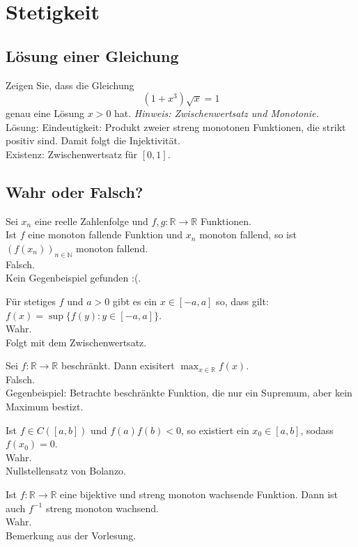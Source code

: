 \section{Stetigkeit}
\subsection{Lösung einer Gleichung}
Zeigen Sie, dass die Gleichung
\begin{displaymath}
  (1+x^3)\sqrt{x} = 1
\end{displaymath}
genau eine Lösung $x > 0$ hat. \textit{Hinweis: Zwischenwertsatz und Monotonie.}\\
Lösung: Eindeutigkeit: Produkt zweier streng monotonen Funktionen, die strikt positiv sind.
Damit folgt die Injektivität.\\
Existenz: Zwischenwertsatz für $[0,1]$.

\subsection{Wahr oder Falsch?}
Sei $x_n$ eine reelle Zahlenfolge und $f,g : \mathbb{R} \to \mathbb{R}$ Funktionen.\\
Ist $f$ eine monoton fallende Funktion und $x_n$ monoton fallend, so ist $(f(x_n))_{n \in \mathbb{N}}$ monoton fallend.\\
Falsch.\\
Kein Gegenbeispiel gefunden :(.

Für stetiges $f$ und $a > 0$ gibt es ein $x \in [-a,a]$ so, dass gilt: $f(x) = \sup\{f(y) : y \in [-a,a]\}$.\\
Wahr.\\
Folgt mit dem Zwischenwertsatz.

Sei $f : \mathbb{R} \to \mathbb{R}$ beschränkt.
Dann exisitert $\max_{x \in \mathbb{R}} f(x)$.\\
Falsch.\\
Gegenbeispiel: Betrachte beschränkte Funktion, die nur ein Supremum, aber kein Maximum bestizt.

Ist $f \in C([a,b])$ und $f(a)f(b) < 0$, so existiert ein $x_0 \in [a,b]$, sodass $f(x_0) = 0$.\\
Wahr.\\
Nullstellensatz von Bolanzo.

Ist $f : \mathbb{R} \to \mathbb{R}$ eine bijektive und streng monoton wachsende Funktion.
Dann ist auch $f^{-1}$ streng monoton wachsend.\\
Wahr.\\
Bemerkung aus der Vorlesung.

